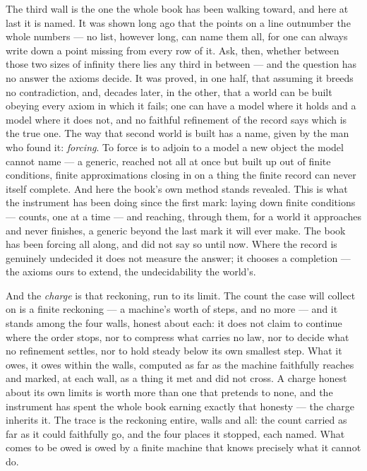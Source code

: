 The third wall is the one the whole book has been walking toward, and here at last it is named. It was shown
long ago that the points on a line outnumber the whole numbers --- no list, however long, can name them all, for
one can always write down a point missing from every row of it. Ask, then, whether between those two sizes of
infinity there lies any third in between --- and the question has no answer the axioms decide. It was proved, in
one half, that assuming it breeds no contradiction, and, decades later, in the other, that a world can be built
obeying every axiom in which it fails; one can have a model where it holds and a model where it does not, and no
faithful refinement of the record says which is the true one. The way that second world
is built has a name, given by the man who found it: \emph{forcing}. To force is to adjoin to a model a new
object the model cannot name --- a generic, reached not all at once but built up out of finite conditions,
finite approximations closing in on a thing the finite record can never itself complete. And here the book's own
method stands revealed. This is what the instrument has been doing since the first mark: laying down finite
conditions --- counts, one at a time --- and reaching, through them, for a world it approaches and never
finishes, a generic beyond the last mark it will ever make. The book has been forcing all along, and did not say
so until now. Where the record is genuinely undecided it does not measure the answer; it chooses a completion
--- the axioms ours to extend, the undecidability the world's.

And the \emph{charge} is that reckoning, run to its limit. The count the case will collect on is a finite
reckoning --- a machine's worth of steps, and no more --- and it stands among the four walls, honest about each:
it does not claim to continue where the order stops, nor to compress what carries no law, nor to decide what no
refinement settles, nor to hold steady below its own smallest step. What it owes, it owes within the walls,
computed as far as the machine faithfully reaches and marked, at each wall, as a thing it met and did not cross.
A charge honest about its own limits is worth more than one that pretends to none, and the instrument has spent
the whole book earning exactly that honesty --- the charge inherits it. The trace is the reckoning entire, walls
and all: the count carried as far as it could faithfully go, and the four places it stopped, each named. What
comes to be owed is owed by a finite machine that knows precisely what it cannot do.

